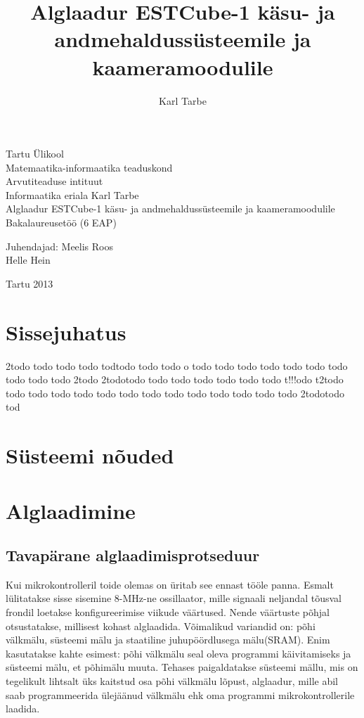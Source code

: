 \documentclass[12pt,a4paper]{article}
\title{Alglaadur ESTCube-1 käsu- ja andmehaldussüsteemile ja kaameramoodulile}
\author{Karl Tarbe}
\begin{document}
\begin{titlepage}
\begin{center}
Tartu Ülikool\\
Matemaatika-informaatika teaduskond\\
Arvutiteaduse intituut\\
Informaatika eriala
\vfill
Karl Tarbe\\[1cm]
Alglaadur ESTCube-1 käsu- ja andmehaldussüsteemile ja kaameramoodulile\\[4mm]
Bakalaureusetöö (6 EAP)
\vspace{2cm}
\begin{flushright}
	Juhendajad: Meelis Roos\\
	Helle Hein
\end{flushright}
\vfill
Tartu 2013
\end{center}
\end{titlepage}

\tableofcontents

\section{Sissejuhatus}
2todo todo todo todo todtodo todo todo o todo todo todo todo todo todo todo todo todo todo
2todo 2todotodo todo todo todo todo todo todo
t!!!odo t2todo todo todo todo todo todo todo todo todo todo todo todo todo todo
2todotodo tod 

\section{Süsteemi nõuded}
\section{Alglaadimine}
\subsection{Tavapärane alglaadimisprotseduur}
Kui mikrokontrolleril toide olemas on üritab see ennast tööle panna.
Esmalt lülitatakse sisse sisemine 8-MHz-ne ossillaator, mille signaali
neljandal tõusval frondil loetakse konfigureerimise viikude väärtused. Nende
väärtuste põhjal otsustatakse, millisest kohast alglaadida. Võimalikud
variandid on: põhi välkmälu, süsteemi mälu ja staatiline juhupöördlusega
mälu(SRAM).  Enim kasutatakse kahte esimest: põhi välkmälu seal oleva programmi
käivitamiseks ja süsteemi mälu, et põhimälu muuta. Tehases paigaldatakse
süsteemi mällu, mis on tegelikult lihtsalt üks kaitstud osa põhi välkmälu
lõpust, alglaadur, mille abil saab programmeerida ülejäänud välkmälu ehk oma
programmi mikrokontrollerile laadida.
\end{document}
